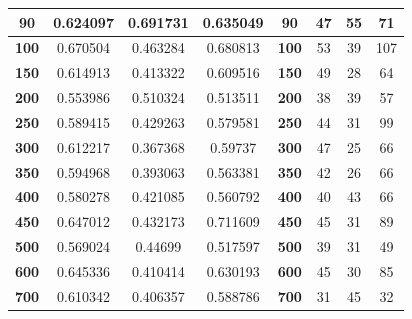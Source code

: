 \documentclass[10pt,a4paper]{article}
\begin{document}
\begin{table}
\begin{tabular}{|c|c|c|c|c|c|c|c|}
\textbf{90}                 & 0.624097                 & 0.691731                 & 0.635049                & \textbf{90}   & 47                & 55                & 71               \\ \hline
\textbf{100}                & 0.670504                 & 0.463284                 & 0.680813                & \textbf{100}  & 53                & 39                & 107              \\ \hline
\textbf{150}                & 0.614913                 & 0.413322                 & 0.609516                & \textbf{150}  & 49                & 28                & 64               \\ \hline
\textbf{200}                & 0.553986                 & 0.510324                 & 0.513511                & \textbf{200}  & 38                & 39                & 57               \\ \hline
\textbf{250}                & 0.589415                 & 0.429263                 & 0.579581                & \textbf{250}  & 44                & 31                & 99               \\ \hline
\textbf{300}                & 0.612217                 & 0.367368                 & 0.59737                 & \textbf{300}  & 47                & 25                & 66               \\ \hline
\textbf{350}                & 0.594968                 & 0.393063                 & 0.563381                & \textbf{350}  & 42                & 26                & 66               \\ \hline
\textbf{400}                & 0.580278                 & 0.421085                 & 0.560792                & \textbf{400}  & 40                & 43                & 66               \\ \hline
\textbf{450}                & 0.647012                 & 0.432173                 & 0.711609                & \textbf{450}  & 45                & 31                & 89               \\ \hline
\textbf{500}                & 0.569024                 & 0.44699                  & 0.517597                & \textbf{500}  & 39                & 31                & 49               \\ \hline
\textbf{600}                & 0.645336                 & 0.410414                 & 0.630193                & \textbf{600}  & 45                & 30                & 85               \\ \hline
\textbf{700}                & 0.610342                 & 0.406357                 & 0.588786                & \textbf{700}  & 31                 & 45                & 32                \\ \hline

\end{tabular}
\end{table}
\end{document}
